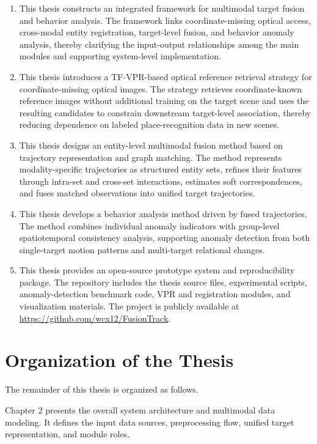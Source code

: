 \begin{enumerate}
  \item This thesis constructs an integrated framework for multimodal target fusion and behavior analysis. The framework links coordinate-missing optical access, cross-modal entity registration, target-level fusion, and behavior anomaly analysis, thereby clarifying the input-output relationships among the main modules and supporting system-level implementation.

  \item This thesis introduces a TF-VPR-based optical reference retrieval strategy for coordinate-missing optical images. The strategy retrieves coordinate-known reference images without additional training on the target scene and uses the resulting candidates to constrain downstream target-level association, thereby reducing dependence on labeled place-recognition data in new scenes.

  \item This thesis designs an entity-level multimodal fusion method based on trajectory representation and graph matching. The method represents modality-specific trajectories as structured entity sets, refines their features through intra-set and cross-set interactions, estimates soft correspondences, and fuses matched observations into unified target trajectories.

  \item This thesis develops a behavior analysis method driven by fused trajectories. The method combines individual anomaly indicators with group-level spatiotemporal consistency analysis, supporting anomaly detection from both single-target motion patterns and multi-target relational changes.

  \item This thesis provides an open-source prototype system and reproducibility package. The repository includes the thesis source files, experimental scripts, anomaly-detection benchmark code, VPR and registration modules, and visualization materials. The project is publicly available at \url{https://github.com/wcx12/FusionTrack}.
\end{enumerate}

\section{Organization of the Thesis}
The remainder of this thesis is organized as follows.

Chapter 2 presents the overall system architecture and multimodal data modeling. It defines the input data sources, preprocessing flow, unified target representation, and module roles.

